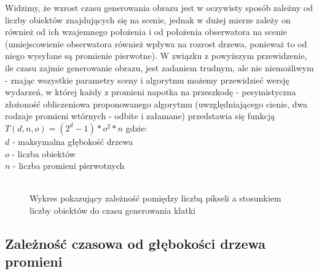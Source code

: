 Widzimy, że wzrost czasu generowania obrazu jest w oczywisty sposób zależny od liczby obiektów znajdujących się na scenie, jednak w dużej mierze zależy on również od ich wzajemnego położenia i od położenia obserwatora na scenie (umiejscowienie obserwatora również wpływa na rozrost drzewa, ponieważ to od niego wysyłane są promienie pierwotne). W związku z powyższym przewidzenie, ile czasu zajmie generowanie obrazu, jest zadaniem trudnym, ale nie niemożliwym - znając wszystkie parametry sceny i algorytmu możemy przewidzieć wersję wydarzeń, w której każdy z promieni napotka na przeszkodę - pesymistyczna złożoność obliczeniowa proponowanego algorytmu (uwzględniającego cienie, dwa rodzaje promieni wtórnych - odbite i załamane) przedstawia się funkcją $T(d,n,o) = (2^d - 1) * o^2 * n$ gdzie:
\\
$d$ - maksymalna głębokość drzewa \\
$o$ - liczba obiektów \\
$n$ - liczba promieni pierwotnych \\ 
\\
\begin{figure}[H]
\centering
\advance\leftskip-1cm
\caption{Wykres pokazujący zależność pomiędzy liczbą pikseli a stosunkiem liczby obiektów do czasu generowania klatki}
\label{stos}
\end{figure}

\subsection{Zależność czasowa od głębokości drzewa promieni}


